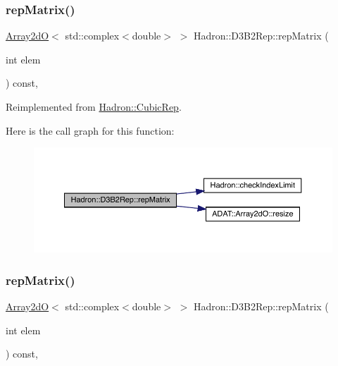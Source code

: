 \subsubsection{\texorpdfstring{repMatrix()}{repMatrix()}\hspace{0.1cm}{\footnotesize\ttfamily [1/3]}}
{\footnotesize\ttfamily \mbox{\hyperlink{classADAT_1_1Array2dO}{Array2dO}}$<$ std\+::complex$<$double$>$ $>$ Hadron\+::\+D3\+B2\+Rep\+::rep\+Matrix (\begin{DoxyParamCaption}\item[{int}]{elem }\end{DoxyParamCaption}) const\hspace{0.3cm}{\ttfamily [inline]}, {\ttfamily [virtual]}}



Reimplemented from \mbox{\hyperlink{structHadron_1_1CubicRep_ac5d7e9e6f4ab1158b5fce3e4ad9e8005}{Hadron\+::\+Cubic\+Rep}}.

Here is the call graph for this function\+:
\nopagebreak
\begin{figure}[H]
\begin{center}
\leavevmode
\includegraphics[width=350pt]{d3/d61/structHadron_1_1D3B2Rep_a3e946b6e27ca026d8e7b1bcd02471deb_cgraph}
\end{center}
\end{figure}
\mbox{\label{structHadron_1_1D3B2Rep_a3e946b6e27ca026d8e7b1bcd02471deb}} 
\subsubsection{\texorpdfstring{repMatrix()}{repMatrix()}\hspace{0.1cm}{\footnotesize\ttfamily [2/3]}}
{\footnotesize\ttfamily \mbox{\hyperlink{classADAT_1_1Array2dO}{Array2dO}}$<$ std\+::complex$<$double$>$ $>$ Hadron\+::\+D3\+B2\+Rep\+::rep\+Matrix (\begin{DoxyParamCaption}\item[{int}]{elem }\end{DoxyParamCaption}) const\hspace{0.3cm}{\ttfamily [inline]}, {\ttfamily [virtual]}}



